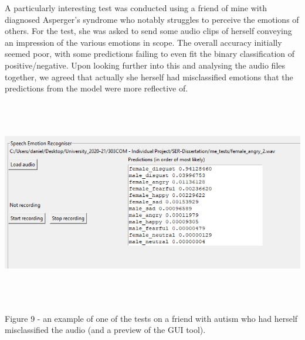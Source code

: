 \documentclass[12pt]{article}
\begin{document}
\noindent A particularly interesting test was conducted using a friend of mine with diagnosed Asperger's syndrome who notably struggles to perceive the emotions of others. For the test, she was asked to send some audio clips of herself conveying an impression of the various emotions in scope. The overall accuracy initially seemed poor, with some predictions failing to even fit the binary classification of positive/negative. Upon looking further into this and analysing the audio files together, we agreed that actually she herself had misclassified emotions that the predictions from the model were more reflective of. 
\begin{center}
\includegraphics[width=16cm, height=9cm]{figure_9_autism}
\end{center}
Figure 9 - an example of one of the tests on a friend with autism who had herself misclassified the audio (and a preview of the GUI tool).
\newpage
\end{document}
